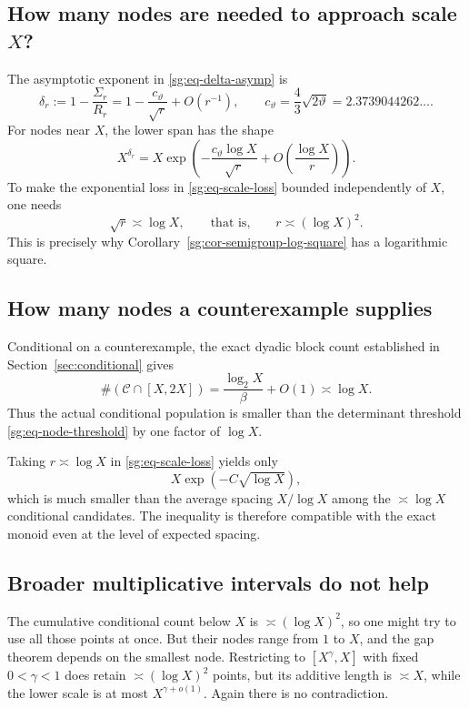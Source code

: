 \documentclass[11pt,oneside]{article}
\theoremstyle{definition}
\theoremstyle{remark}
\newcommand{\thetaq}{\vartheta}
\newcommand{\Cand}{\mathcal C}
\begin{document}
\subsection{How many nodes are needed to approach scale $X$?}

The asymptotic exponent in \eqref{sg:eq-delta-asymp} is
\[
 \delta_r:=1-\frac{\Sigma_r}{R_r}
 =1-\frac{c_{\thetaq}}{\sqrt r}+O(r^{-1}),
 \qquad
 c_{\thetaq}=\frac43\sqrt{2\thetaq}=2.3739044262\ldots.
\]
For nodes near $X$, the lower span has the shape
\begin{equation}
 X^{\delta_r}
 =X\exp\!\left(-\frac{c_{\thetaq}\log X}{\sqrt r}+O\!\left(\frac{\log X}{r}\right)\right).
 \label{sg:eq-scale-loss}
\end{equation}
To make the exponential loss in \eqref{sg:eq-scale-loss} bounded independently of $X$, one
needs
\begin{equation}
 \sqrt r\asymp\log X,
 \qquad\text{that is,}\qquad
 r\asymp(\log X)^2.
 \label{sg:eq-node-threshold}
\end{equation}
This is precisely why Corollary~\ref{sg:cor-semigroup-log-square} has a logarithmic square.

\subsection{How many nodes a counterexample supplies}

Conditional on a counterexample, the exact dyadic block count established in
Section~\ref{sec:conditional} gives
\begin{equation}
 \#(\Cand\cap[X,2X])
 =\frac{\log_2X}{\beta}+O(1)
 \asymp\log X.
 \label{sg:eq-conditional-log-population}
\end{equation}
Thus the actual conditional population is smaller than the determinant threshold
\eqref{sg:eq-node-threshold} by one factor of $\log X$.

Taking $r\asymp\log X$ in \eqref{sg:eq-scale-loss} yields only
\[
 X\exp(-C\sqrt{\log X}),
\]
which is much smaller than the average spacing $X/\log X$ among the
$\asymp\log X$ conditional candidates.  The inequality is therefore compatible with the
exact monoid even at the level of expected spacing.

\subsection{Broader multiplicative intervals do not help}

The cumulative conditional count below $X$ is $\asymp(\log X)^2$, so one might try to use all
those points at once.  But their nodes range from $1$ to $X$, and the gap theorem depends on
the smallest node.  Restricting to $[X^\gamma,X]$ with fixed $0<\gamma<1$ does retain
$\asymp(\log X)^2$ points, but its additive length is $\asymp X$, while the lower scale is at
most $X^{\gamma+o(1)}$.  Again there is no contradiction.
\end{document}
